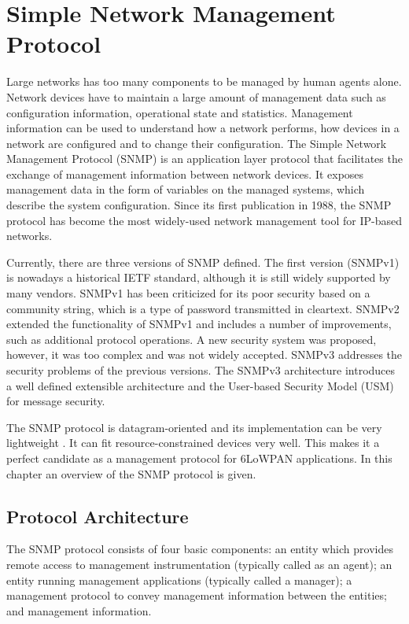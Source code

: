 \chapter{Simple Network Management Protocol}\label{ch:snmp}
Large networks has too many components to be managed by human agents alone. Network devices have to maintain a large amount of management data such as configuration information,  operational state and statistics. Management information can be used to understand how a network performs, how devices in a network are configured and to change their configuration. The Simple Network Management Protocol (SNMP) \cite{rfc3410} is an application layer protocol that facilitates the exchange of management information between network devices. It exposes management data in the form of variables on the managed systems, which describe the system configuration. Since its first publication in 1988, the SNMP protocol has become the most widely-used network management tool for IP-based networks.

Currently, there are three versions of SNMP defined. The first version (SNMPv1) is nowadays a historical IETF standard, although it is still widely supported by many vendors. SNMPv1 has been criticized for its poor security based on a community string, which is a type of password transmitted in cleartext. SNMPv2 extended the functionality of SNMPv1 and includes a number of improvements, such as additional protocol operations. A new security system was proposed, however, it was too complex and was not widely accepted. SNMPv3 addresses the security problems of the previous versions. The SNMPv3 architecture introduces a well defined extensible architecture and the User-based Security Model (USM) for message security.

The SNMP protocol is datagram-oriented and its implementation can be very lightweight \cite{draft-6lowpan-snmp}. It can fit resource-constrained devices very well. This makes it a perfect candidate as a management protocol for 6LoWPAN applications. In this chapter an overview of the SNMP protocol is given.

\section{Protocol Architecture}
The SNMP protocol consists of four basic components: an entity which provides remote access to management instrumentation (typically called as an agent); an entity running management applications (typically called a manager); a management protocol to convey management information between the entities; and management information.

